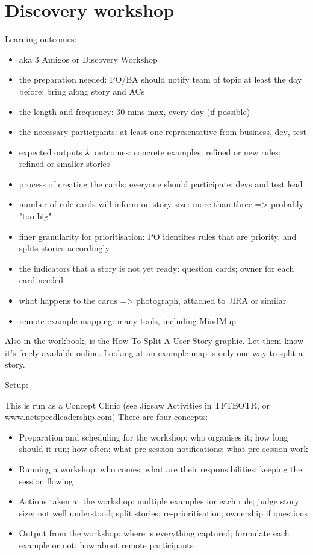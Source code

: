 \chapter*{Discovery workshop}

\ifnotes

    Learning outcomes:
        \begin{itemize}
            \item aka 3 Amigos or Discovery Workshop
            \item the preparation needed: PO/BA should notify team of topic at least the day before; bring along story and ACs
            \item the length and frequency: 30 mins max, every day (if possible)
            \item the necessary participants: at least one representative from business, dev, test
            \item expected outputs \& outcomes: concrete examples; refined or new rules; refined or smaller stories
            \item process of creating the cards: everyone should participate; devs and test lead
            \item number of rule cards will inform on story size: more than three => probably "too big"
            \item finer granularity for prioritisation: PO identifies rules that are priority, and splits stories accordingly
            \item the indicators that a story is not yet ready: question cards; owner for each card needed
            \item what happens to the cards => photograph, attached to JIRA or similar 
            \item remote example mapping: many tools, including MindMup           
        \end{itemize}    
        
        Also in the workbook,  is the How To Split A User Story graphic. Let them know it's freely available online. Looking at an example map is only one way to split a story.    

    Setup:
    
        This is run as a Concept Clinic (see Jigsaw Activities in TFTBOTR, or www.netspeedleadership.com) There are four concepts:
        
        \begin{itemize}
            \item Preparation and scheduling for the workshop: who organises it; how long should it run; how often; what pre-session notifications; what pre-session work
            \item Running a workshop: who comes; what are their responsibilities; keeping the session flowing
            \item Actions taken at the workshop:  multiple examples for each rule; judge story size; not well understood; split stories; re-prioritisation; ownership if questions
            \item Output from the workshop: where is everything captured; formulate each example or not; how about remote participants
        \end{itemize}
        
